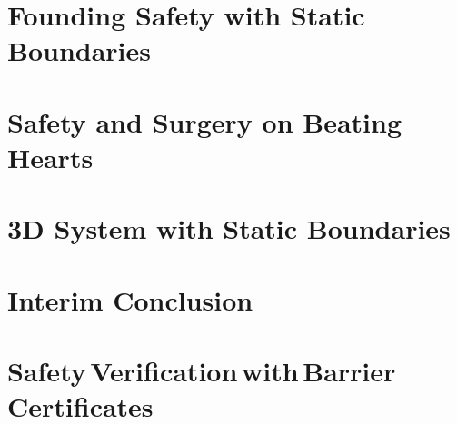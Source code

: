 \chapter{Founding Safety with Static Boundaries}\label{chap:cbf_1d_static}


\chapter{Safety and Surgery on Beating Hearts} \label{chap:cbf_1d_dynamic}

\chapter{3D System with Static Boundaries}\label{chap:cbf_3d_static}

%
\chapter{Interim Conclusion}\label{chap:interim}


\chapter[Safety Verification with Barrier Certificates]{Safety\,Verification\,with\,Barrier\,Certificates}\label{chap:putinar}
	
